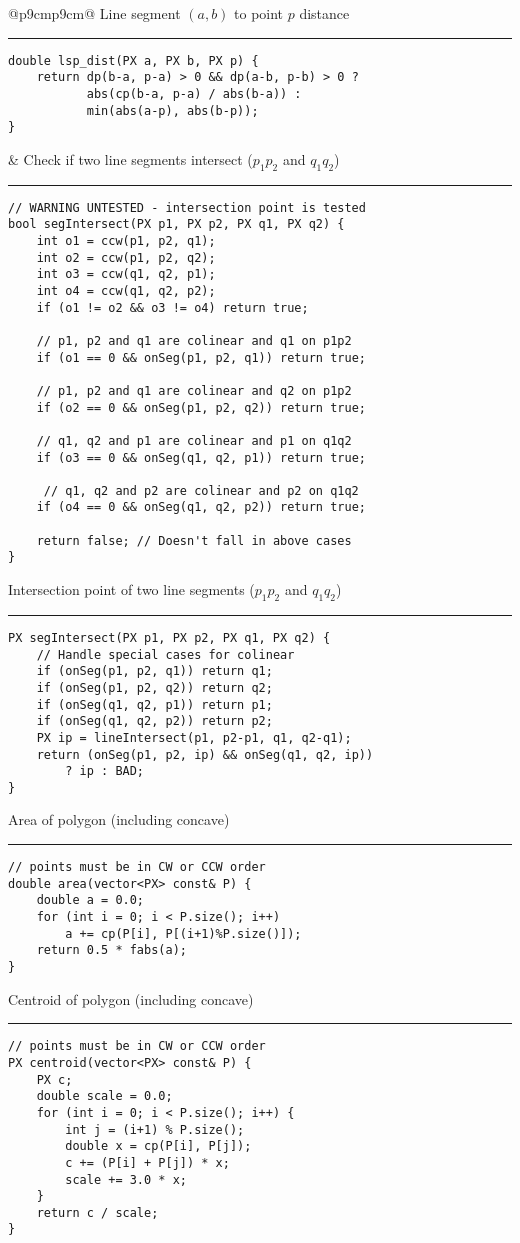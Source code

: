 \documentclass[letterpaper]{article}
\newcommand{\rx}[1]{#1\hrule}
\begin{document}
\begin{tabular}{@{}p{9cm}p{9cm}@{}}
    \rx{Line segment $(a, b)$ to point $p$ distance}
    \begin{lstlisting}
double lsp_dist(PX a, PX b, PX p) {
	return dp(b-a, p-a) > 0 && dp(a-b, p-b) > 0 ?
	       abs(cp(b-a, p-a) / abs(b-a)) :
	       min(abs(a-p), abs(b-p));
}
\end{lstlisting}
     &
    \rx{Check if two line segments intersect ($p_1p_2$ and $q_1q_2$)}
    \begin{lstlisting}
// WARNING UNTESTED - intersection point is tested
bool segIntersect(PX p1, PX p2, PX q1, PX q2) {
    int o1 = ccw(p1, p2, q1);
    int o2 = ccw(p1, p2, q2);
    int o3 = ccw(q1, q2, p1);
    int o4 = ccw(q1, q2, p2);
    if (o1 != o2 && o3 != o4) return true;

    // p1, p2 and q1 are colinear and q1 on p1p2
    if (o1 == 0 && onSeg(p1, p2, q1)) return true;
 
    // p1, p2 and q1 are colinear and q2 on p1p2
    if (o2 == 0 && onSeg(p1, p2, q2)) return true;
 
    // q1, q2 and p1 are colinear and p1 on q1q2
    if (o3 == 0 && onSeg(q1, q2, p1)) return true;
 
     // q1, q2 and p2 are colinear and p2 on q1q2
    if (o4 == 0 && onSeg(q1, q2, p2)) return true;
 
    return false; // Doesn't fall in above cases
}
\end{lstlisting}

    \rx{Intersection point of two line segments ($p_1p_2$ and $q_1q_2$)}
    \begin{lstlisting}
PX segIntersect(PX p1, PX p2, PX q1, PX q2) {
	// Handle special cases for colinear
	if (onSeg(p1, p2, q1)) return q1;
	if (onSeg(p1, p2, q2)) return q2;
	if (onSeg(q1, q2, p1)) return p1;
	if (onSeg(q1, q2, p2)) return p2;
	PX ip = lineIntersect(p1, p2-p1, q1, q2-q1);
	return (onSeg(p1, p2, ip) && onSeg(q1, q2, ip))
		? ip : BAD;
}
\end{lstlisting}
    \rx{Area of polygon (including concave)}
    \begin{lstlisting}
// points must be in CW or CCW order
double area(vector<PX> const& P) {
	double a = 0.0;
	for (int i = 0; i < P.size(); i++)
		a += cp(P[i], P[(i+1)%P.size()]);
	return 0.5 * fabs(a);
}
\end{lstlisting}

    \rx{Centroid of polygon (including concave)}
    \begin{lstlisting}
// points must be in CW or CCW order
PX centroid(vector<PX> const& P) {
	PX c;
	double scale = 0.0;
	for (int i = 0; i < P.size(); i++) {
		int j = (i+1) % P.size();
		double x = cp(P[i], P[j]);
		c += (P[i] + P[j]) * x;
		scale += 3.0 * x;
	}
	return c / scale;
}
\end{lstlisting}
\end{tabular}
\end{document}
